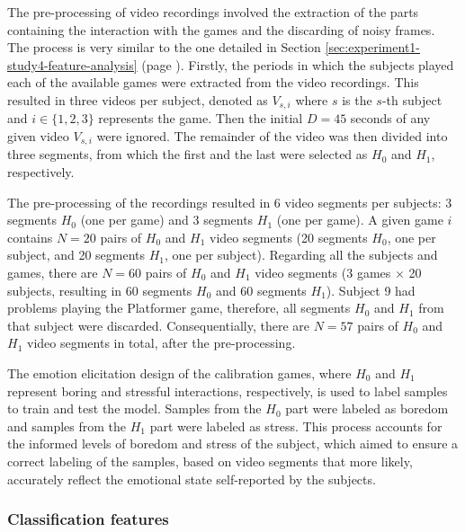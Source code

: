 The pre-processing of video recordings involved the extraction of the parts containing the interaction with the games and the discarding of noisy frames. The process is very similar to the one detailed in Section \ref{sec:experiment1-study4-feature-analysis} (page \pageref{sec:experiment1-study4-feature-analysis}). Firstly, the periods in which the subjects played each of the available games were extracted from the video recordings. This resulted in three videos per subject, denoted as $V_{s,i}$ where $s$ is the $s$-th subject and $i \in \{1, 2, 3\}$ represents the game. Then the initial $D=45$ seconds of any given video $V_{s,i}$ were ignored. The remainder of the video was then divided into three segments, from which the first and the last were selected as $H_0$ and $H_1$, respectively.

The pre-processing of the recordings resulted in 6 video segments per subjects: 3 segments $H_0$ (one per game) and 3 segments $H_1$ (one per game). A given game $i$ contains $N=20$ pairs of $H_0$ and $H_1$ video segments (20 segments $H_0$, one per subject, and 20 segments $H_1$, one per subject). Regarding all the subjects and games, there are $N=60$ pairs of $H_0$ and $H_1$ video segments (3 games $\times$ 20 subjects, resulting in 60 segments $H_0$ and 60 segments $H_1$). Subject 9 had problems playing the Platformer game, therefore, all segments $H_0$ and $H_1$ from that subject were discarded. Consequentially, there are $N=57$ pairs of $H_0$ and $H_1$ video segments in total, after the pre-processing.

The emotion elicitation design of the calibration games, where $H_0$ and $H_1$ represent boring and stressful interactions, respectively, is used to label samples to train and test the model. Samples from the $H_0$ part were labeled as boredom and samples from the $H_1$ part were labeled as stress. This process accounts for the informed levels of boredom and stress of the subject, which aimed to ensure a correct labeling of the samples, based on video segments that more likely, accurately reflect the emotional state self-reported by the subjects.

\subsubsection{Classification features}

